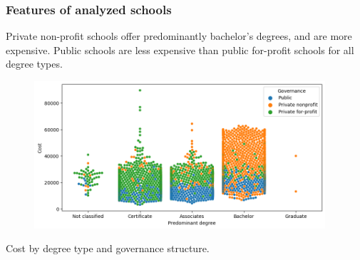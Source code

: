 \documentclass{beamer}
\begin{document}
\begin{frame} 
\frametitle{Features of analyzed schools}
Private non-profit schools offer predominantly bachelor's degrees, and are more expensive. Public schools are less expensive than public for-profit schools for all degree types.

\begin{center}
\begin{figure}
\includegraphics[width=4.25in]{currentPriceDegreeSwarm.png}
\end{figure}
Cost by degree type and governance structure.
\end{center}
\end{frame}
\end{document}
